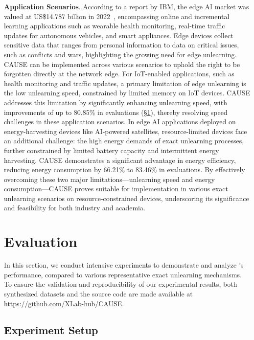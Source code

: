 \documentclass[conference,compsoc]{IEEEtran}
\begin{document}
\noindent\textbf{Application Scenarios}. According to a report by IBM, the edge AI market was valued at US\$14.787 billion in 2022~\cite{edgeai}, encompassing online and incremental learning applications such as wearable health monitoring, real-time traffic updates for autonomous vehicles, and smart appliances. 
Edge devices collect sensitive data that ranges from personal information to data on critical issues, such as conflicts and wars, highlighting the growing need for edge unlearning. CAUSE can be implemented across various scenarios to uphold the right to be forgotten directly at the network edge. For IoT-enabled applications, such as health monitoring and traffic updates, a primary limitation of edge unlearning is the low unlearning speed, constrained by limited memory on IoT devices. CAUSE addresses this limitation by significantly enhancing unlearning speed, with improvements of up to 80.85\% in evaluations (\S\ref{sec:evaluation}), thereby resolving speed challenges in these application scenarios.
In edge AI applications deployed on energy-harvesting devices like AI-powered satellites, resource-limited devices face an additional challenge: the high energy demands of exact unlearning processes, further constrained by limited battery capacity and intermittent energy harvesting. CAUSE demonstrates a significant advantage in energy efficiency, reducing energy consumption by 66.21\% to 83.46\% in evaluations. By effectively overcoming these two major limitations—unlearning speed and energy consumption—CAUSE proves suitable for implementation in various exact unlearning scenarios on resource-constrained devices, underscoring its significance and feasibility for both industry and academia.



\section{Evaluation}
\label{sec:evaluation}

In this section, we conduct intensive experiments to demonstrate and analyze \tool's performance, compared to various representative exact unlearning mechanisms. To ensure the validation and reproducibility of our experimental results, both synthesized datasets and the source code are made available at \url{https://github.com/XLab-hub/CAUSE}.

\subsection{Experiment Setup}
\label{subsec:exp_setup}
\end{document}
